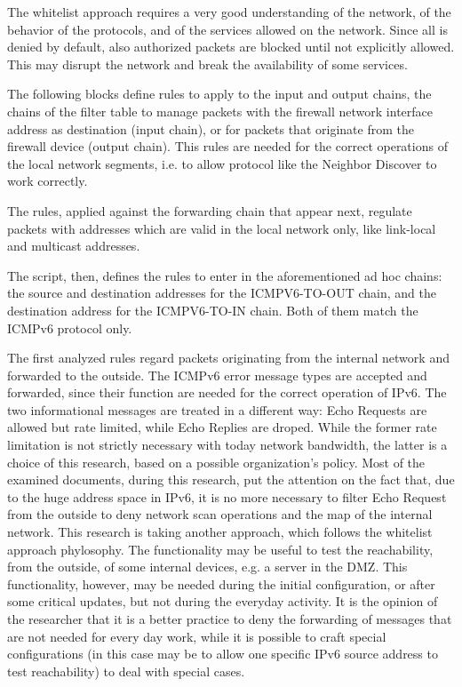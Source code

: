 \documentclass[12pt]{article}
\begin{document}
The whitelist approach requires a very good understanding of the network, of the behavior of the protocols, and of the services allowed on the network. Since all is denied by default, also authorized packets are blocked until not explicitly allowed. This may disrupt the network and break the availability of some services.

The following blocks define rules to apply to the input and output chains, the chains of the filter table to manage packets with the firewall network interface address as destination (input chain), or for packets that originate from the firewall device (output chain). This rules are needed for the correct operations of the local network segments, i.e. to allow protocol like the Neighbor Discover to work correctly.

The rules, applied against the forwarding chain that appear next, regulate packets with addresses which are valid in the local network only, like link-local and multicast addresses.

The script, then, defines the rules to enter in the aforementioned ad hoc chains: the source and destination addresses for the ICMPV6-TO-OUT chain, and the destination address for the ICMPV6-TO-IN chain. Both of them match the ICMPv6 protocol only.

The first analyzed rules regard packets originating from the internal network and forwarded to the outside. The ICMPv6 error message types are accepted and forwarded, since their function are needed for the correct operation of IPv6. The two informational messages are treated in a different way: Echo Requests are allowed but rate limited, while Echo Replies are droped. While the former rate limitation is not strictly necessary with today network bandwidth, the latter is a choice of this research, based on a possible organization's policy. Most of the examined documents, during this research, put the attention on the fact that, due to the huge address space in IPv6, it is no more necessary to filter Echo Request from the outside to deny network scan operations and the map of the internal network. This research is taking another approach, which follows the whitelist approach phylosophy. The functionality may be useful to test the reachability, from the outside, of some internal devices, e.g. a server in the DMZ. This functionality, however, may be needed during the initial configuration, or after some critical updates, but not during the everyday activity. It is the opinion of the researcher that it is a better practice to deny the forwarding of messages that are not needed for every day work, while it is possible to craft special configurations (in this case may be to allow one specific IPv6 source address to test reachability) to deal with special cases.
\end{document}
